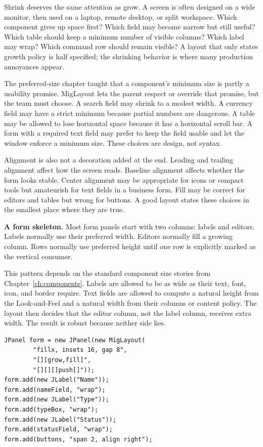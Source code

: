 Shrink deserves the same attention as grow. A screen is often designed on a
wide monitor, then used on a laptop, remote desktop, or split workspace. Which
component gives up space first? Which field may become narrow but still useful?
Which table should keep a minimum number of visible columns? Which label may
wrap? Which command row should remain visible? A layout that only states growth
policy is half specified; the shrinking behavior is where many production
annoyances appear.

The preferred-size chapter taught that a component's minimum size is partly a
usability promise. MigLayout lets the parent respect or override that promise,
but the team must choose. A search field may shrink to a modest width. A
currency field may have a strict minimum because partial numbers are dangerous.
A table may be allowed to lose horizontal space because it has a horizontal
scroll bar. A form with a required text field may prefer to keep the field
usable and let the window enforce a minimum size. These choices are design, not
syntax.

Alignment is also not a decoration added at the end. Leading and trailing
alignment affect how the screen reads. Baseline alignment affects whether the
form looks stable. Center alignment may be appropriate for icons or compact
tools but amateurish for text fields in a business form. Fill may be correct for
editors and tables but wrong for buttons. A good layout states these choices in
the smallest place where they are true.

\textbf{A form skeleton.}
Most form panels start with two columns: labels and editors. Labels normally use their preferred width. Editors normally fill a growing column. Rows normally use preferred height until one row is explicitly marked as the vertical consumer.

This pattern depends on the standard component size stories from
Chapter~\ref{ch:components}. Labels are allowed to be as wide as their text,
font, icon, and border require. Text fields are allowed to compute a natural
height from the Look-and-Feel and a natural width from their columns or content
policy. The layout then decides that the editor column, not the label column,
receives extra width. The result is robust because neither side lies.

\begin{lstlisting}[caption={A compact MigLayout form pattern.}]
JPanel form = new JPanel(new MigLayout(
        "fillx, insets 16, gap 8",
        "[][grow,fill]",
        "[][][]push[]"));
form.add(new JLabel("Name"));
form.add(nameField, "wrap");
form.add(new JLabel("Type"));
form.add(typeBox, "wrap");
form.add(new JLabel("Status"));
form.add(statusField, "wrap");
form.add(buttons, "span 2, align right");
\end{lstlisting}

